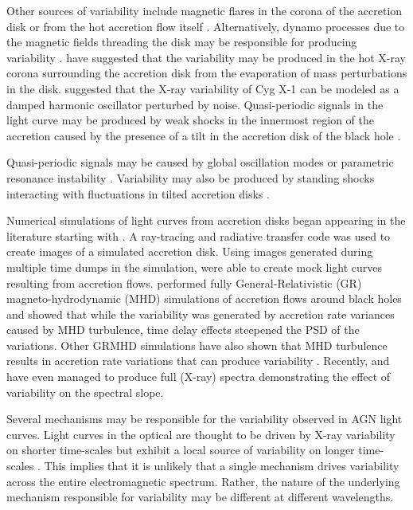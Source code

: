 \documentclass[a4paper,fleqn,usenatbib]{mnras}
\begin{document}
Other sources of variability include magnetic flares in the corona of the accretion disk \citep{PoutanenFabian99} or from the hot accretion flow itself \citep{Veledina13}. Alternatively, dynamo processes due to the magnetic fields threading the disk may be responsible for producing variability \citep{LivioPringleKing03,King04,MayerPringle06}. \citet{JaniukCzerny07} have suggested that the variability may be produced in the hot X-ray corona surrounding the accretion disk from the evaporation of mass perturbations in the disk. \citet{Misra08} suggested that the X-ray variability of Cyg X-1 can be modeled as a damped harmonic oscillator perturbed by noise. Quasi-periodic signals in the light curve may be produced by weak shocks in the innermost region of the accretion caused by the presence of a tilt in the accretion disk of the black hole \citep{FragileBlaes07,FragileBlaes08}. 

Quasi-periodic signals may be caused by global oscillation modes or parametric resonance instability \citep{ReynoldsMiller09a,ReynoldsMiller09b,Oneill11}. Variability may also be produced by standing shocks interacting with fluctuations in tilted accretion disks \citep{Henisey12}.

Numerical simulations of light curves from accretion disks began appearing in the literature starting with \citet{Schnittman06}. A ray-tracing and radiative transfer code was used to create images of a simulated accretion disk. Using images generated during multiple time dumps in the simulation, \citet{Schnittman06} were able to create mock light curves resulting from accretion flows. \citet{Noble09} performed fully General-Relativistic (GR) magneto-hydrodynamic (MHD) simulations of accretion flows around black holes and showed that while the variability was generated by accretion rate variances caused by MHD turbulence, time delay effects steepened the PSD of the variations. Other GRMHD simulations have also shown that MHD turbulence results in accretion rate variations that can produce variability \citep{Moscibrodzka09,Dexter09,Dexter10}. Recently, \citet{Schnittman13a} and \citet{Schnittman13b} have even managed to produce full (X-ray) spectra demonstrating the effect of variability on the spectral slope. 

Several mechanisms may be responsible for the variability observed in AGN light curves. Light curves in the optical are thought to be driven by X-ray variability on shorter time-scales but exhibit a local source of variability on longer time-scales \citep{UttleyAccretion}. This implies that it is unlikely that a single mechanism drives variability across the entire electromagnetic spectrum. Rather, the nature of the underlying mechanism responsible for variability may be different at different wavelengths.
\end{document}
